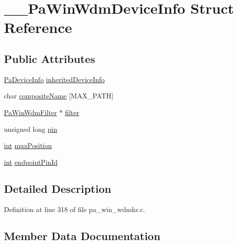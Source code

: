\hypertarget{struct_____pa_win_wdm_device_info}{}\section{\+\_\+\+\_\+\+Pa\+Win\+Wdm\+Device\+Info Struct Reference}
\label{struct_____pa_win_wdm_device_info}
\subsection*{Public Attributes}
\begin{DoxyCompactItemize}
\item 
\hyperlink{struct_pa_device_info}{Pa\+Device\+Info} \hyperlink{struct_____pa_win_wdm_device_info_a529bc0e5844539996188948f28fd6bcd}{inherited\+Device\+Info}
\item 
char \hyperlink{struct_____pa_win_wdm_device_info_a078805bd1a8e163820775d76673d0813}{composite\+Name} \mbox{[}M\+A\+X\+\_\+\+P\+A\+TH\mbox{]}
\item 
\hyperlink{pa__win__wdmks_8c_add25dc7e76c77419d4520c774371efe4}{Pa\+Win\+Wdm\+Filter} $\ast$ \hyperlink{struct_____pa_win_wdm_device_info_a6bb59c9cdcc8861941e589cf0558dfc4}{filter}
\item 
unsigned long \hyperlink{struct_____pa_win_wdm_device_info_ad47a164d9d771b528bb67bb8da07c839}{pin}
\item 
\hyperlink{xmltok_8h_a5a0d4a5641ce434f1d23533f2b2e6653}{int} \hyperlink{struct_____pa_win_wdm_device_info_ac4769a798b0d43861e1ce362afe729b2}{mux\+Position}
\item 
\hyperlink{xmltok_8h_a5a0d4a5641ce434f1d23533f2b2e6653}{int} \hyperlink{struct_____pa_win_wdm_device_info_ad338338f56666dd11ecc1da66602fa5f}{endpoint\+Pin\+Id}
\end{DoxyCompactItemize}


\subsection{Detailed Description}


Definition at line 318 of file pa\+\_\+win\+\_\+wdmks.\+c.



\subsection{Member Data Documentation}
